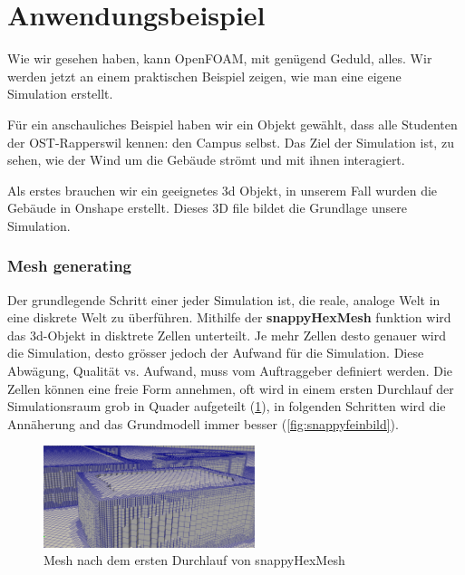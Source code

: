 %
%
%
%
\section{Anwendungsbeispiel
\label{openfoam:section:Anwendungsbeispiel}}
Wie wir gesehen haben, kann OpenFOAM, mit genügend Geduld, alles. 
Wir werden jetzt an einem praktischen Beispiel zeigen, wie man eine eigene Simulation erstellt.

Für ein anschauliches Beispiel haben wir ein Objekt gewählt, dass alle Studenten der OST-Rapperswil kennen: den Campus selbst.
Das Ziel der Simulation ist, zu sehen, wie der Wind um die Gebäude strömt und mit ihnen interagiert.

Als erstes brauchen wir ein geeignetes 3d Objekt, in unserem Fall wurden die Gebäude in Onshape erstellt.
Dieses 3D file bildet die Grundlage unsere Simulation.



\subsubsection{Mesh generating\label{openfoam:section:Mesh generating}}
Der grundlegende Schritt einer jeder Simulation ist, die reale, analoge Welt in eine diskrete Welt zu überführen.
Mithilfe der \textbf{snappyHexMesh} funktion wird das 3d-Objekt in disktrete Zellen unterteilt. Je mehr Zellen desto genauer
wird die Simulation, desto grösser jedoch der Aufwand für die Simulation. Diese Abwägung, Qualität vs. Aufwand, muss vom Auftraggeber definiert werden.
Die Zellen können eine freie Form annehmen, oft wird in einem ersten Durchlauf der Simulationsraum grob in Quader aufgeteilt (\ref{fig:snappygrobbild}),
in folgenden Schritten wird die Annäherung and das Grundmodell immer besser (\ref{fig:snappyfeinbild}).


\begin{figure}
    \centering
    \includegraphics[width=0.55\textwidth]{papers/openfoam/Bilder/Snappy_grob.png}
    \caption{Mesh nach dem ersten Durchlauf von snappyHexMesh}
    \label{fig:snappygrobbild}
\end{figure}

